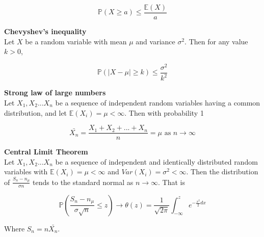 $$\mathbb{P}(X \geq a) \leq \frac{\mathbb{E}(X)}{a}$$

\textbf{Chevyshev's inequality}\\

Let $X$ be a random variable with mean $\mu$ and variance $\sigma^2$. Then for any value $k > 0$, 

$$\mathbb{P}(|X - \mu| \geq k) \leq \frac{\sigma^2}{k^2}$$

\textbf{Strong law of large numbers}\\
Let $X_1, X_2... X_n$ be a sequence of independent random variables having a common distribution, and let $\mathbb{E}(X_i) = \mu < \infty$. Then with probability 1

$$\bar{X_n} =  \frac{X_1+X_2 + ...+ X_n}{n} = \mu \text{ as } n \rightarrow \infty$$

\textbf{Central Limit Theorem}\\
Let $X_1,X_2...X_n$ be a sequence of independent and identically distributed random variables with $\mathbb{E}(X_i) = \mu < \infty$ and $Var(X_i) = \sigma^2 < \infty$. Then the distribution of $\frac{S_n - n_\mu}{\sigma n}$ tends to the standard normal as $n \rightarrow \infty$. That is

$$\mathbb{P}(\frac{S_n - n_\mu}{\sigma \sqrt{n}} \leq z) \rightarrow \theta (z) = \frac{1}{\sqrt{2 \pi}} \int_{-\infty}^{z} e^{-\frac{x^2}{2} dx}$$

Where $S_n = n \bar{X_n}$.